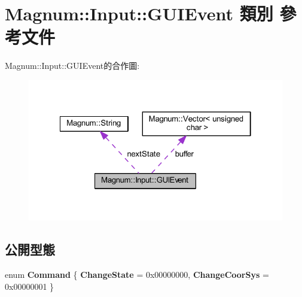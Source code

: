 \hypertarget{class_magnum_1_1_input_1_1_g_u_i_event}{}\section{Magnum\+:\+:Input\+:\+:G\+U\+I\+Event 類別 參考文件}
\label{class_magnum_1_1_input_1_1_g_u_i_event}


Magnum\+:\+:Input\+:\+:G\+U\+I\+Event的合作圖\+:\nopagebreak
\begin{figure}[H]
\begin{center}
\leavevmode
\includegraphics[width=322pt]{class_magnum_1_1_input_1_1_g_u_i_event__coll__graph}
\end{center}
\end{figure}
\subsection*{公開型態}
\begin{DoxyCompactItemize}
\item 
enum {\bfseries Command} \{ {\bfseries Change\+State} = 0x00000000, 
{\bfseries Change\+Coor\+Sys} = 0x00000001
 \}\hypertarget{class_magnum_1_1_input_1_1_g_u_i_event_a54a977105e5af2868651f6324437eb67}{}\label{class_magnum_1_1_input_1_1_g_u_i_event_a54a977105e5af2868651f6324437eb67}

\end{DoxyCompactItemize}
